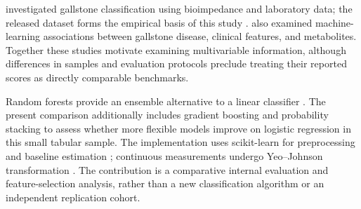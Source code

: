 \textcite{esen2024early} investigated gallstone classification using bioimpedance and laboratory data; the released dataset forms the empirical basis of this study \parencite{uci2025gallstone}. \textcite{salem2023ml} also examined machine-learning associations between gallstone disease, clinical features, and metabolites. Together these studies motivate examining multivariable information, although differences in samples and evaluation protocols preclude treating their reported scores as directly comparable benchmarks.

Random forests provide an ensemble alternative to a linear classifier \parencite{breiman2001randomforests}. The present comparison additionally includes gradient boosting and probability stacking to assess whether more flexible models improve on logistic regression in this small tabular sample. The implementation uses scikit-learn for preprocessing and baseline estimation \parencite{pedregosa2011scikit}; continuous measurements undergo Yeo--Johnson transformation \parencite{yeo2000new}. The contribution is a comparative internal evaluation and feature-selection analysis, rather than a new classification algorithm or an independent replication cohort.
